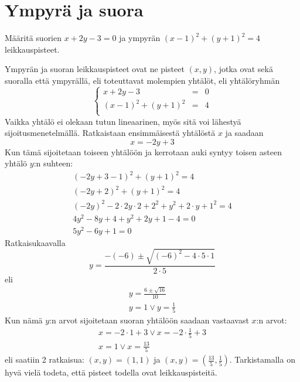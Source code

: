 \section{Ympyrä ja suora}


\begin{esimerkki}
Määritä suorien $x+2y-3=0$ ja ympyrän $(x-1)^2+(y+1)^2=4 $ leikkauspisteet.

\begin{esimratk}

Ympyrän ja suoran leikkauspisteet ovat ne pisteet $(x, y)$, jotka ovat sekä suoralla että ympyrällä, eli toteuttavat molempien yhtälöt, eli yhtälöryhmän
$$\left\{    
    \begin{array}{rcl}
        x+2y-3 &=&0 \\
        (x-1)^2+(y+1)^2 &=&4 \\
    \end{array}
    \right.$$
Vaikka yhtälö ei olekaan tutun lineaarinen, myös sitä voi lähestyä sijoitusmenetelmällä. Ratkaistaan ensimmäisestä yhtälöstä $x$ ja saadaan
\[
x = -2y+3
\]
Kun tämä sijoitetaan toiseen yhtälöön ja kerrotaan auki syntyy toisen asteen yhtälö $y$:n suhteen:
\begin{align*}
(-2y+3-1)^2+(y+1)^2=4 \\
(-2y+2)^2+(y+1)^2=4 \\
(-2y)^2-2\cdot 2y\cdot 2 +2^2+y^2+2\cdot y+1^2=4 \\
4y^2-8y+4+y^2+2y+1-4 = 0 \\
5y^2-6y+1 = 0
\end{align*}
Ratkaisukaavalla
\[
y = \frac{-(-6)\pm\sqrt{(-6)^2-4\cdot 5\cdot 1}}{2\cdot5}
\]
eli
\begin{align*}
y = \frac{6\pm\sqrt{16}}{10} \\
y = 1 \vee y = \frac{1}{5}
\end{align*}
Kun nämä $y$:n arvot sijoitetaan suoran yhtälöön saadaan vastaavast $x$:n arvot:
\begin{align*}
x = -2\cdot 1+3 \vee x = -2\cdot\frac{1}{5}+3 \\
x = 1 \vee x = \frac{13}{5}
\end{align*}
eli saatiin 2 ratkaisua: $(x, y) = (1, 1)$ ja $(x, y) = (\frac{13}{5}, \frac{1}{5})$. Tarkistamalla on hyvä vielä todeta, että pisteet todella ovat leikkauspisteitä.


\end{esimratk}
\end{esimerkki}
